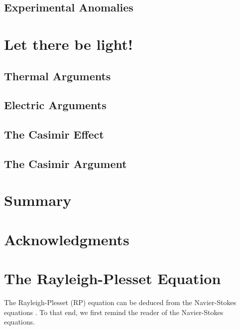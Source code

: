 \documentclass[rmp,aps,nofootinbib,superscriptaddress,floatfix]{revtex4-2}
\begin{document}
\subsection{Experimental Anomalies}


\section{Let there be light!}
\subsection{Thermal Arguments}
\subsection{Electric Arguments}

\subsection{The Casimir Effect}
\subsection{The Casimir Argument}


\section{Summary}

\section{Acknowledgments}

\appendix


\section{The Rayleigh-Plesset Equation}
The Rayleigh-Plesset (RP) equation can be deduced from the Navier-Stokes equations \cite{}. To that end, we first remind the reader of the Navier-Stokes equations. 
\end{document}
